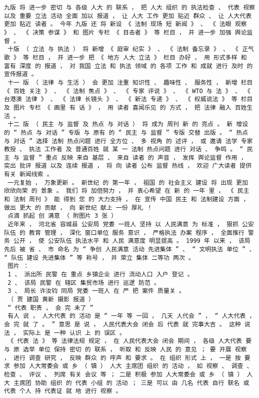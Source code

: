 \documentclass{article}
\begin{document}
\begin{Verbatim}[commandchars=\\\{\}]
 九版 将 进一步 密切 与 各级 人大 的 联系 ， 把 人大 组织 的 执法检查 、 代表 视察 以及 重要 立法 活动 全面 加以 报道 ， 让 人大 工作 更加 贴近 群众 、 让 人大代表 更加 贴近 读者 。 今年 九版 还 将 新设 《 法制 现场 短 新闻 》 、 《 法眼 观察 》 、 《 决策 参谋 》 和 图片 专栏 《 目击者 》 等 栏目 ， 并 进一步 加强 舆论监督 。 
 十版 （ 立法 与 执法 ） 将 新增 《 庭审 纪实 》 、 《 法制 备忘录 》 、 《 正气歌 》 等 栏目 ， 并 进一步 把 《 地方 人大 立法 》 栏目 办好 ， 用 形式多样 和 富有 深度 的 报道 ， 对 我国 立法 和 执法 领域 的 各项 工作 和 成就 进行 及时 的 宣传报道 。 
 十一 版 （ 法律 与 生活 ） 会 更加 注重 知识性 、 趣味性 、 服务性 ， 新增 栏目 《 百姓 关注 》 、 《 法制 焦点 》 、 《 专家 评说 》 、 《 WTO 与 法 》 、 《 台港澳 法律 》 、 《 法律 长镜头 》 、 《 新法 专递 》 、 《 权威说法 》 等 栏目 及 图片 专栏 《 画里 有 话 》 ， 用 读者 喜闻乐见 的 方式 ， 把 法律 融入 百姓生活 。 
 十二 版 （ 民主 与 监督 及 热点 与 对话 ） 将 成为 周刊 新 的 亮点 。 新 增设 的 “ 热点 与 对话 ” 专版 与 原有 的 “ 民主 与 监督 ” 专版 交替 出版 。 “ 热点 与 对话 ” 选择 法制 热点问题 进行 全方位 、 多 视角 的 述评 ， 或 邀请 法学 专家教授 、 执法 工作者 及 普通百姓 就 某 一 法制 热点问题 进行 对话 、 争鸣 。 “ 民主 与 监督 ” 重点 反映 来自 基层 、 来自 读者 的 声音 ， 发挥 舆论监督 作用 ， 突出 批评 报道 以及 连续 报道 ， 将 向 读者 公布 监督 热线 ， 欢迎 广大读者 提供 有关 新闻线索 。 
 一元复始 ， 万象更新 。 新世纪 的 第一年 ， 祖国 的 社会主义 建设 将 出现 更加 欣欣向荣 的 景象 。 我们 将 加倍努力 ， 并 衷心希望 在 新 的 一年 里 ， 《 民主 和 法制 周刊 》 能 得到 您 的 大力支持 ， 在 宣传 中国 民主 和 法制建设 方面 ， 做出 更大 的 贡献 ， 向 新世纪 献上 一份 厚礼 ！ 
 点滴 抓起 创 满意 （ 附图片 3 张 ） 
 近年来 ， 河北省 容城县 公安局 党委 一班人 坚持 以 人民满意 为 标准 ， 狠抓 公安队伍 的 教育 管理 ， 深化 窗口单位 服务 意识 ， 严格执法 办案 程序 ， 全面推行 警务 公开 ， 使 公安队伍 执法水平 和 人民 满意度 明显提高 。 1999 年 以来 ， 该局 先后 被 省 、 市 命名 为 “ 争创 人民满意 活动 先进集体 ” 、 “ 文明执法 单位 ” 、 “ 队伍 建设 先进集体 ” 等 称号 ， 并 荣立 集体 二等功 两次 。 
 图片 ： 
 1 、 派出所 民警 在 重点 乡镇企业 进行 流动人口 入户 登记 。 
 2 、 该局 民警 在 辖区 集贸市场 进行 巡逻 防范 。 
 3 、 局长 许汝钧 同局 党委 一班人 在 严 把 案件 质量关 。 
 （ 贾 建国 黄新 摄影 报道 ） 
 “ 代表 职责 ， 会 完 未了 ” 
 有人 说 ， 人大代表 的 活动 是 “ 一年 等 一回 ， 几天 人代会 ” ， “ 人大代表 ， 会 完 就 了 。 ” 意思 是 说 ， 人民代表大会 闭会 后 代表 就 完事大吉 。 这种 说法 ， 实际上 是 一种 认识 上 的 误区 。 
 《 代表 法 》 等 法律法规 规定 ， 在 人民代表大会 闭会 期间 ， 各级 人大代表 要 与 原 选举 单位 保持 密切 的 联系 ， 听取 和 反映 人民 的 意见 ； 要 开展 视察 ， 进行 调查 研究 ， 反映 群众 的 呼声 和 要求 。 在 组织 形式 上 ， 一是 按 要求 参加 人大常委会 或 乡 （ 镇 ） 人大 主席团 组织 的 活动 ， 如 视察 、 调查 、 检查 、 评议 、 列席 有关 会议 等 ； 二是 积极 参加 人大常委会 或 乡 （ 镇 ） 人大 主席团 协助 组织 的 代表 小组 的 活动 ； 三是 可以 由 几名 代表 自行 联名 或 代表 个人 持 代表证 就 地 进行 视察 。 

\end{Verbatim}
\end{document}
